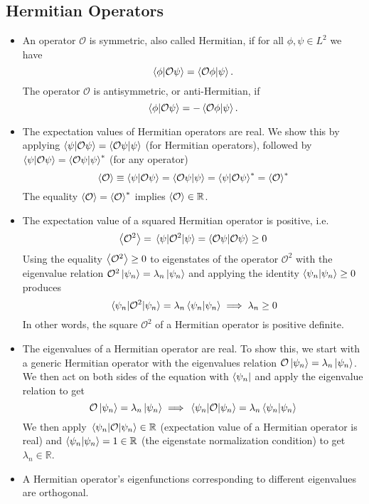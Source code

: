 \documentclass[11pt, a4paper]{article}
\newcommand{\Herm}{Hermitian\xspace}
\renewcommand{\O}{\mathcal{O}}  %
\newcommand{\p}{\psi}  %
\begin{document}
\subsection{Hermitian Operators}
\begin{itemize}
	\item An operator $ \O $ is symmetric, also called Hermitian, if for all $ \phi, \psi \in L^{2} $ we have
	\begin{equation*}
		\braket{\phi}{\O \p} = \braket{\O\phi}{\p}.
	\end{equation*}
	The operator $ \O $ is antisymmetric, or anti-Hermitian, if
	\begin{equation*}
		\braket{\phi}{\O \p} = - \braket{\O \phi}{\p}.
	\end{equation*}
	
	\item The expectation values of Hermitian operators are real. We show this by applying $ \braket{\p}{\O \p} = \braket{\O \p}{\p} $ (for \Herm operators), followed by $ \braket{\p}{\O \p} = \braket{\O \p}{\p}^{*} $  (for any operator)
	\begin{equation*}
		\ev{\O} \equiv \braket{\psi}{\O \psi} = \braket{\O \psi}{\psi} = 		\braket{\psi}{\O \psi}^{*} = \ev{\O}^{*}
	\end{equation*}
	The equality $ \ev{\O} = \ev{\O}^{*} $ implies $ \ev{\O} \in \mathbb{R} $. 
	
	\item The expectation value of a squared \Herm operator is positive, i.e.
	\begin{equation*}
		\ev{\O^{2}} = \mel{\p}{\O^{2}}{\p} = \braket{\O \p}{\O \p}\geq 0
	\end{equation*}
	Using the equality $ \ev{\O^{2}} \geq 0 $ to eigenstates of the operator $ \O^{2} $ with the eigenvalue relation $ \O^{2} \ket{\psi_{n}} = \lambda_{n} \ket{\psi_{n}} $ and applying the identity $ \braket{\p_{n}}{\p_{n}} \geq 0 $ produces
	\begin{equation*}
		\mel{\p_{n}}{\O^{2}}{\p_{n}} = \lambda_{n}\braket{\psi_{n}}{\p_{n}} \implies \lambda_{n} \geq 0
	\end{equation*}
	In other words, the square $ \O^{2} $ of a \Herm operator is positive definite.
	
	\item The eigenvalues of a \Herm operator are real. To show this, we start with a generic \Herm operator with the eigenvalues relation $  \O \ket{\psi_{n}} = \lambda_{n} \ket{\psi_{n}} $. We then act on both sides of the equation with $ \bra{\p_{n}} $ and apply the eigenvalue relation to get
	\begin{equation*}
		\O \ket{\p_{n}} = \lambda_{n} \ket{\p_{n}} \implies \mel{\p_{n}}{\O}{\p_{n}} = \lambda_{n} \braket{\p_{n}}{\p_{n}}
	\end{equation*}
	We then apply $ \mel{\p_{n}}{\O}{\p_{n}} \in \mathbb{R} $ (expectation value of a \Herm operator is real) and $ \braket{\p_{n}}{\p_{n}} = 1 \in \mathbb{R} $ (the eigenstate normalization condition) to get $ \lambda_{n} \in \mathbb{R} $. 
	
	\item A \Herm operator's eigenfunctions corresponding to different eigenvalues are orthogonal. 
\end{itemize}
\end{document}
